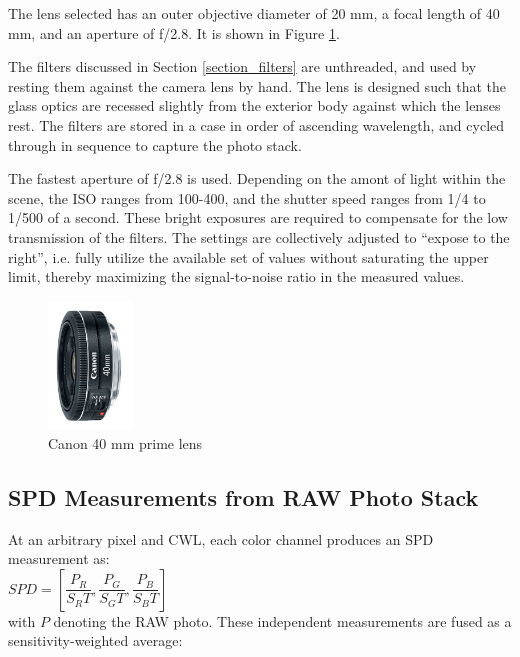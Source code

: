 \documentclass[twocolumn,10pt]{asme2ej}
\begin{document}
The lens selected has an outer objective diameter of 20 mm, a focal length of 40 mm, and an aperture of f/2.8. It is shown in Figure \ref{canon_40_mm_prime_lens}.

The filters discussed in Section \ref{section_filters} are unthreaded, and used by resting them against the camera lens by hand. The lens is designed such that the glass optics are recessed slightly from the exterior body against which the lenses rest. The filters are stored in a case in order of ascending wavelength, and cycled through in sequence to capture the photo stack.

The fastest aperture of f/2.8 is used. Depending on the amont of light within the scene, the ISO ranges from 100-400, and the shutter speed ranges from 1/4 to 1/500 of a second. These bright exposures are required to compensate for the low transmission of the filters. The settings are collectively adjusted to ``expose to the right'', i.e. fully utilize the available set of values without saturating the upper limit, thereby maximizing the signal-to-noise ratio in the measured values.

\begin{figure}
\centering
\includegraphics[width=0.2\textwidth]{canon_40_mm_prime_lens.jpg}
\caption{Canon 40 mm prime lens}
\label{canon_40_mm_prime_lens}
\end{figure}

\subsection{SPD Measurements from RAW Photo Stack}

\noindent At an arbitrary pixel and CWL, each color channel produces an SPD measurement as: \\

\noindent $SPD = \left[ \dfrac{P_R}{S_RT},\dfrac{P_G}{S_GT},\dfrac{P_B}{S_BT} \right] $ \\

\noindent with $P$ denoting the RAW photo. These independent measurements are fused as a sensitivity-weighted average:\\
\end{document}
